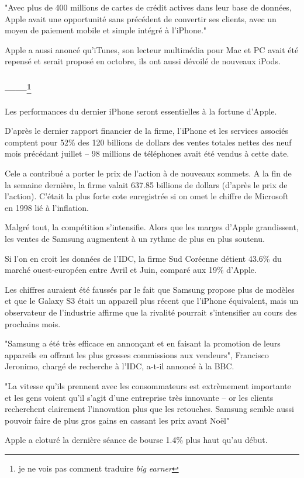 \documentclass[a4paper, 11pt]{article}
\begin{document}
"Avec plus de 400 millions de cartes de crédit actives dans leur base de données, Apple avait une opportunité sans
précédent de convertir ses clients, avec un moyen de paiement mobile et simple intégré à l'iPhone."

Apple a aussi anoncé qu'iTunes, son lecteur multimédia pour Mac et PC avait été repensé et serait proposé en octobre,
ils ont aussi dévoilé de nouveaux iPods.

\subsubsection*{------\footnote{je ne vois pas comment traduire {\it big earner}}}

Les performances du dernier iPhone seront essentielles à la fortune d'Apple.

D'après le dernier rapport financier de la firme, l'iPhone et les services associés comptent pour 52\% des 120 billions
de dollars des ventes totales nettes des neuf mois précédant juillet -- 98 millions de téléphones avait été vendus à
cette date.

Cele a contribué a porter le prix de l'action à de nouveaux sommets.
A la fin de la semaine dernière, la firme valait 637.85 billions de dollars (d'après le prix de l'action).
C'était la plus forte cote enregistrée si on omet le chiffre de Microsoft en 1998 lié à l'inflation.

Malgré tout, la compétition s'intensifie.
Alors que les marges d'Apple grandissent, les ventes de Samsung augmentent à un rythme de plus en plus soutenu.

Si l'on en croit les données de l'IDC, la firme Sud Coréenne détient 43.6\% du marché ouest-européen entre Avril et
Juin, comparé aux 19\% d'Apple.

Les chiffres auraient été faussés par le fait que Samsung propose plus de modèles et que le Galaxy S3 était un appareil
plus récent que l'iPhone équivalent, mais un observateur de l'industrie affirme que la rivalité pourrait s'intensifier
au cours des prochains mois.

"Samsung a été très efficace en annonçant et en faisant la promotion de leurs appareils en offrant les plus grosses
commissions aux vendeurs", Francisco Jeronimo, chargé de recherche à l'IDC, a-t-il annoncé à la BBC.

"La vitesse qu'ils prennent avec les consommateurs est extrèmement importante et les gens voient qu'il s'agit d'une entreprise
très innovante -- or les clients recherchent clairement l'innovation plus que les retouches.
Samsung semble aussi pouvoir faire de plus gros gains en cassant les prix avant Noël"

Apple a cloturé la dernière séance de bourse 1.4\% plus haut qu'au début.
\end{document}
